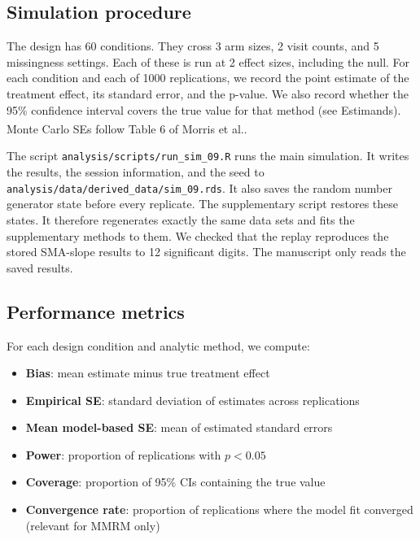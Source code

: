 \documentclass[
  11pt,
]{article}
\providecommand{\tightlist}{%
  \setlength{\itemsep}{0pt}\setlength{\parskip}{0pt}}
\begin{document}
\subsection{Simulation procedure}\label{simulation-procedure}

The design has 60 conditions. They cross 3
arm sizes, 2 visit counts, and 5 missingness settings. Each of
these is run at 2 effect sizes, including the null. For each
condition and each of 1000 replications, we record the
point estimate of the treatment effect, its standard error,
and the p-value. We also record whether the 95\% confidence
interval covers the true value for that method (see
Estimands). Monte Carlo SEs follow Table 6 of
Morris et al.\textsuperscript{}.

The script \texttt{analysis/scripts/run\_sim\_09.R} runs the main
simulation. It writes the results, the session information,
and the seed to \texttt{analysis/data/derived\_data/sim\_09.rds}. It also
saves the random number generator state before every
replicate. The supplementary script restores these states. It
therefore regenerates exactly the same data sets and fits the
supplementary methods to them. We checked that the replay
reproduces the stored SMA-slope results to 12 significant
digits. The manuscript only reads the saved results.

\subsection{Performance metrics}\label{performance-metrics}

For each design condition and analytic method, we compute:

\begin{itemize}
\tightlist
\item
  \textbf{Bias}: mean estimate minus true treatment effect
\item
  \textbf{Empirical SE}: standard deviation of estimates across
  replications
\item
  \textbf{Mean model-based SE}: mean of estimated standard errors
\item
  \textbf{Power}: proportion of replications with \(p < 0.05\)
\item
  \textbf{Coverage}: proportion of 95\% CIs containing the true
  value
\item
  \textbf{Convergence rate}: proportion of replications where the
  model fit converged (relevant for MMRM only)
\end{itemize}
\end{document}
